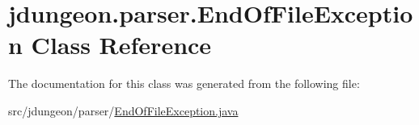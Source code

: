 \hypertarget{classjdungeon_1_1parser_1_1_end_of_file_exception}{
\section{jdungeon.parser.EndOfFileException Class Reference}
\label{classjdungeon_1_1parser_1_1_end_of_file_exception}
}


The documentation for this class was generated from the following file:\begin{DoxyCompactItemize}
\item 
src/jdungeon/parser/\hyperlink{_end_of_file_exception_8java}{EndOfFileException.java}\end{DoxyCompactItemize}
